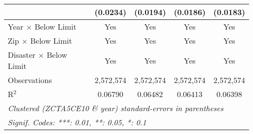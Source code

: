 \begin{tabular*}{0.8\textwidth}{@{\extracolsep{\fill}}lcccc}
                                                       & (0.0234)        & (0.0194)        & (0.0186)        & (0.0183)\\   
   \midrule
   Year $\times$ Below Limit                           & Yes             & Yes             & Yes             & Yes\\  
   Zip $\times$ Below Limit                            & Yes             & Yes             & Yes             & Yes\\  
   Disaster $\times$ Below Limit                       & Yes             & Yes             & Yes             & Yes\\  
   \midrule
   Observations                                        & 2,572,574       & 2,572,574       & 2,572,574       & 2,572,574\\  
   R$^2$                                               & 0.06790         & 0.06482         & 0.06413         & 0.06398\\  
   \bottomrule
   \multicolumn{5}{l}{\emph{Clustered (ZCTA5CE10 \& year) standard-errors in parentheses}}\\
   \multicolumn{5}{l}{\emph{Signif. Codes: ***: 0.01, **: 0.05, *: 0.1}}\\
\end{tabular*}